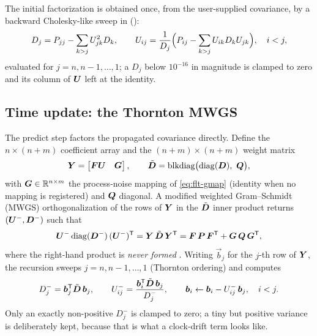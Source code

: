The initial factorization is obtained once, from the user-supplied covariance,
by a backward Cholesky-like sweep in 
():
\begin{equation}
  \label{eq:flt-udu-decomp}
  D_j = P_{jj} - \sum_{k>j} U_{jk}^2 D_k ,
  \qquad
  U_{ij} = \frac{1}{D_j}\Bigl(P_{ij} - \sum_{k>j} U_{ik} D_k U_{jk}\Bigr),
  \quad i < j ,
\end{equation}
evaluated for $j = n, n-1, \dots, 1$; a $D_j$ below $10^{-16}$ in magnitude is
clamped to zero and its column of $\bm{U}$ left at the identity.

\subsection{Time update: the Thornton MWGS}

The predict step factors the propagated covariance directly. Define the
$n \times (n+m)$ coefficient array and the $(n+m)\times(n+m)$ weight matrix
\begin{equation}
  \label{eq:flt-udu-mwgs-y}
  \mat{Y} = \begin{bmatrix} \mat{F}\mat{U} & \mat{G} \end{bmatrix},
  \qquad
  \tilde{\mat{D}} = \operatorname{blkdiag}\bigl(\diag(\vec{D}),\ \mat{Q}\bigr) ,
\end{equation}
with $\bm{G} \in \mathbb{R}^{n\times m}$ the process-noise mapping of
\cref{eq:flt-gmap} (identity when no mapping is registered) and $\bm{Q}$
diagonal. A modified weighted Gram--Schmidt (MWGS) orthogonalization of the
rows of $\bm{Y}$ in the $\tilde{\bm{D}}$ inner product returns
$(\bm{U}^{-}, \bm{D}^{-})$ such that
\begin{equation}
  \label{eq:flt-udu-mwgs}
  \bm{U}^{-}\operatorname{diag}(\bm{D}^{-})\,(\bm{U}^{-})^{\mathsf{T}}
  = \bm{Y}\,\tilde{\bm{D}}\,\bm{Y}^{\mathsf{T}}
  = \bm{F}\,\bm{P}\,\bm{F}^{\mathsf{T}} + \bm{G}\,\bm{Q}\,\bm{G}^{\mathsf{T}} ,
\end{equation}
where the right-hand product is \emph{never formed}
\citep[Ch.~6.2.2, Eqs.~6.20--6.23]{iiyama2026thesis}. Writing
$\vec{b}_j$ for the $j$-th row of $\bm{Y}$, the recursion sweeps
$j = n, n-1, \dots, 1$ (Thornton ordering) and computes
\begin{equation}
  \label{eq:flt-udu-mwgs-rec}
  D^{-}_j = \bm{b}_j^{\mathsf{T}} \tilde{\bm{D}}\,\bm{b}_j ,
  \qquad
  U^{-}_{ij} = \frac{\bm{b}_i^{\mathsf{T}} \tilde{\bm{D}}\,\bm{b}_j}{D^{-}_j},
  \qquad
  \bm{b}_i \leftarrow \bm{b}_i - U^{-}_{ij}\,\bm{b}_j ,
  \quad i < j .
\end{equation}
Only an exactly non-positive $D^{-}_j$ is clamped to zero; a tiny but positive
variance is deliberately kept, because that is what a clock-drift term looks
like.

